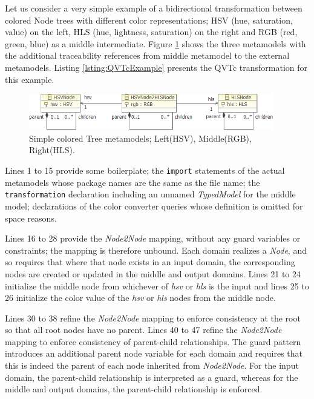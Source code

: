 Let us consider a very simple example of a bidirectional transformation between colored Node trees with different color representations; HSV (hue, saturation, value) on the left, HLS (hue, lightness, saturation) on the right and RGB (red, green, blue) as a middle intermediate. Figure \ref{fig:TreeMM} shows the three metamodels with the additional traceability references from middle metamodel to the external metamodels.  Listing \ref{lsting:QVTcExample} presents the QVTc transformation for this example.

\begin{figure}[hb]
	\centering
	\includegraphics[width=0.95\textwidth]{Metamodels.png}
	\caption{Simple colored Tree metamodels; Left(HSV), Middle(RGB), Right(HLS).}
	\label{fig:TreeMM}
\end{figure}



Lines 1 to 15 provide some boilerplate; the \texttt{import} statements of the actual metamodels whose package names are the same as the file name; the \texttt{transform\-ation} declaration including an unnamed \textit{TypedModel} for the middle model; declarations of the color converter queries whose definition is omitted for space reasons.

Lines 16 to 28 provide the \textit{Node2Node} mapping, without any guard variables or constraints; the mapping is therefore unbound. Each domain realizes a \textit{Node}, and so requires that where that node exists in an input domain, the corresponding nodes are created or updated in the middle and output domains. Lines 21 to 24 initialize the middle node from whichever of \textit{hsv} or \textit{hls} is the input and lines 25 to 26 initialize the color value of the \textit{hsv} or \textit{hls} nodes from the middle node.

Lines 30 to 38 refine the \textit{Node2Node} mapping to enforce consistency at the root so that all root nodes have no parent. Lines 40 to 47 refine the \textit{Node2Node} mapping to enforce consistency of parent-child relationships. The guard pattern introduces an additional parent node variable for each domain and requires that this is indeed the parent of each node inherited from \textit{Node2Node}. For the input domain, the parent-child relationship is interpreted as a guard, whereas for the middle and output domains, the parent-child relationship is enforced.

